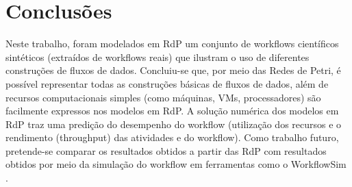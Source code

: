\documentclass[a4paper,10pt]{article}
\begin{document}
\section*{Conclusões}

Neste trabalho, foram modelados em RdP um conjunto de workflows científicos sintéticos (extraídos de workflows reais) que ilustram o uso de diferentes construções de fluxos de dados. Concluiu-se que, por meio das Redes de Petri, é possível representar todas as construções básicas de fluxos de dados, além de recursos computacionais simples (como máquinas, VMs, processadores) são facilmente expressos nos modelos em RdP. A solução numérica dos modelos em RdP traz uma predição do desempenho do workflow (utilização dos recursos e o rendimento (throughput) das atividades e do workflow). Como trabalho futuro, pretende-se comparar os resultados obtidos a partir das RdP com resultados obtidos por meio da simulação do workflow em ferramentas como o WorkflowSim \cite{chen:workflowsim}.



\end{document}
